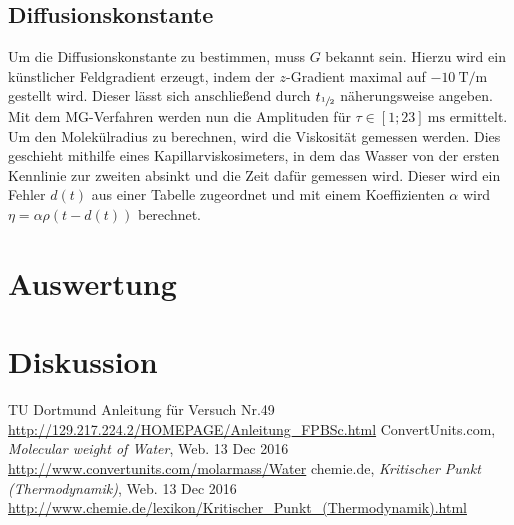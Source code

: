 \subsection{Diffusionskonstante}
Um die Diffusionskonstante zu bestimmen, muss $G$ bekannt sein. Hierzu wird ein künstlicher Feldgradient erzeugt, indem der $z$-Gradient maximal 
auf $-\SI{10}{\tesla\per\m}$ gestellt wird. Dieser lässt sich anschließend durch $t_{\sfrac12}$ näherungsweise angeben. Mit dem MG-Verfahren
werden nun die Amplituden für $\tau\in[1;23]\SI{}{\milli\second}$ ermittelt. Um den Molekülradius zu berechnen, wird die Viskosität gemessen
werden. Dies geschieht mithilfe eines Kapillarviskosimeters, in dem das Wasser von der ersten Kennlinie zur zweiten absinkt und die Zeit
dafür gemessen wird. Dieser wird ein Fehler $d(t)$ aus einer Tabelle zugeordnet und mit einem Koeffizienten $\alpha$ wird $\eta=\alpha\rho(t-d(t))$
berechnet.

\section{Auswertung}
\section{Diskussion}


\newpage
 \begin{thebibliography}{WissOnl}
 	 TU Dortmund Anleitung für Versuch Nr.49 \url{http://129.217.224.2/HOMEPAGE/Anleitung_FPBSc.html}
 	 ConvertUnits.com, \textit{Molecular weight of Water}, Web. 13 Dec 2016 \url{http://www.convertunits.com/molarmass/Water}
	 chemie.de, \textit{Kritischer Punkt (Thermodynamik)}, Web. 13 Dec 2016 \url{http://www.chemie.de/lexikon/Kritischer_Punkt_(Thermodynamik).html}
 	\end{thebibliography}




